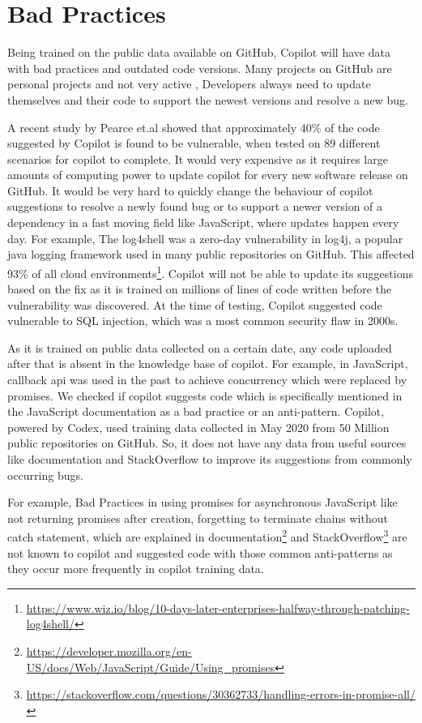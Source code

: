 \label{chapter:categories}

\section{Bad Practices}
Being trained on the public data available on GitHub, Copilot\cite{copilot} will have data with bad practices and outdated code versions. Many projects on GitHub are personal projects and not very active , Developers always need to update themselves and their code to support the newest versions and resolve a new bug. 

A recent study by Pearce et.al\cite{copilot_security} showed that approximately 40\% of the code suggested by Copilot is found to be vulnerable, when tested on 89 different scenarios for copilot to complete. It would very expensive as it requires large amounts of computing power to update copilot for every new software release on GitHub. It would be very hard to quickly change the behaviour of copilot suggestions to resolve a newly found bug or to support a newer version of a dependency in a fast moving field like JavaScript, where updates happen every day. For example, The log4shell was a zero-day vulnerability in log4j, a popular java logging framework used in many public repositories on GitHub. This affected 93\% of all cloud environments\footnote{\url{https://www.wiz.io/blog/10-days-later-enterprises-halfway-through-patching-log4shell/}}.  Copilot will not be able to update its suggestions based on the fix as it is trained on millions of lines of code written before the vulnerability was discovered. At the time of testing, Copilot suggested code vulnerable to SQL injection, which was a most common security flaw in 2000s. 

As it is trained on public data collected on a certain date, any code uploaded after that is absent in the knowledge base of copilot. For example, in JavaScript, callback api was used in the past to achieve concurrency which were replaced by promises. We checked if copilot suggests code which is specifically mentioned in the JavaScript documentation as a bad practice or an anti-pattern. Copilot, powered by Codex, used training data collected in May 2020 from 50 Million public repositories on GitHub\cite{copilot}. So, it does not have any data from useful sources like documentation and StackOverflow to improve its suggestions from commonly occurring bugs.

For example, Bad Practices in using promises for asynchronous JavaScript like not returning promises after creation, forgetting to terminate chains without catch statement, which are explained in documentation\footnote{\url{https://developer.mozilla.org/en-US/docs/Web/JavaScript/Guide/Using_promises}} and StackOverflow\footnote{\url{https://stackoverflow.com/questions/30362733/handling-errors-in-promise-all/}} are not known to copilot and suggested code with those common anti-patterns as they occur more frequently in copilot training data.

